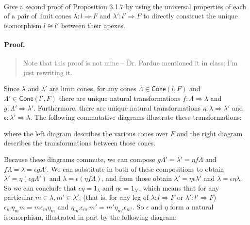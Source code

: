 \documentclass[main.tex]{subfiles}
\begin{document}
	
\paragraph{}
\begin{exercise}
Give a second proof of Proposition 3.1.7 by using the universal properties of
each of a pair of limit cones $ \lambda \colon l \Rightarrow F $
and $ \lambda' \colon l' \Rightarrow F $ to directly construct the unique
isomorphism $ l \cong l' $ between their apexes.
\end{exercise}
\paragraph{Proof.}

\begin{quote}
	{\small Note that this proof is not mine -- Dr. Pardue mentioned it in class; I'm just rewriting it.}
\end{quote}

Since $ \lambda $ and $ \lambda' $ are limit cones, for any cones $ \Lambda \in \mathsf{Cone}(l, F) $ and  $ \Lambda' \in \mathsf{Cone}(l', F) $ there are unique natural transformations $ f \colon \Lambda \Rightarrow \lambda $ and $ g \colon \Lambda' \Rightarrow \lambda' $. Furthermore, there are unique natural transformations $ \eta \colon \lambda \Rightarrow \lambda' $ and $ \epsilon \colon \lambda' \Rightarrow \lambda $. The following commutative diagrams illustrate these transformations:


\noindent where the left diagram describes the various cones over $ F $ and the right diagram describes the transformations between those cones.

Because these diagrams commute, we can compose $ g\Lambda' = \lambda' = \eta f \Lambda $ and $ f \Lambda = \lambda = \epsilon g \Lambda' $. We can substitute in both of these compositions to obtain $\lambda' = \eta (\epsilon g \Lambda') $ and $ \lambda = \epsilon (\eta f \Lambda) $, and from those obtain $ \lambda' = \eta \epsilon \lambda' $ and $ \lambda = \epsilon \eta \lambda $. So we can conclude that $ \epsilon \eta = 1_\lambda $ and $\eta \epsilon = 1_{\lambda'} $, which means that for any particular $ m \in \lambda, m' \in \lambda' $, (that is, for any leg of $ \lambda: l \Rightarrow F $ or $ \lambda': l' \Rightarrow F $) $ \epsilon_m \eta_m m = m \epsilon_m \eta_m $ and $ \eta_{m'} \epsilon_{m'} m' = m' \eta_{m'} \epsilon_{m'} $. So $ \epsilon $ and $ \eta $ form a natural isomorphism, illustrated in part by the following diagram:
\end{document}
